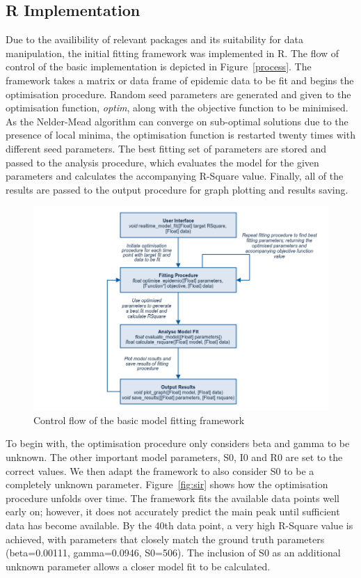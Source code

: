 \subsection{R Implementation}
Due to the availibility of relevant packages and its suitability for
data manipulation, the initial fitting framework was implemented in
R. The flow of control of the basic implementation is depicted in
Figure~\ref{process}. The framework takes a matrix or data frame of epidemic data
to be fit and begins the optimisation procedure. Random seed
parameters are generated and given to the optimisation function,
\emph{optim}, along with the objective function to be minimised. As
the Nelder-Mead algorithm can converge on sub-optimal solutions due to
the presence of local minima, the optimisation function is restarted
twenty times with different seed parameters. The best fitting set of
parameters are stored and passed to the analysis procedure, which
evaluates the model for the given parameters and calculates the
accompanying R-Square value. Finally, all of the results are passed to
the output procedure for graph plotting and results saving.  

\begin{centering}
\begin{figure}[ht!]
  \includegraphics[width=15cm]{images/process.png}
 \caption{Control flow of the basic model fitting framework} 
\label{fig:process}
\end{figure}
\end{centering}

To begin with, the optimisation procedure only considers beta and
gamma to be unknown. The other important model parameters, S0, I0 and
R0 are set to the correct values. We then adapt the framework to also
consider S0 to be a completely unknown parameter. Figure~\ref{fig:sir} shows how the optimisation
procedure unfolds over time. The framework fits the available data
points well early on; however, it does not accurately predict the main
peak until sufficient data has become available. By the 40th data
point, a very high R-Square value is achieved, with parameters that
closely match the ground truth parameters (beta=0.00111, gamma=0.0946,
S0=506). The inclusion of S0 as an additional unknown parameter allows
a closer model fit to be calculated.

